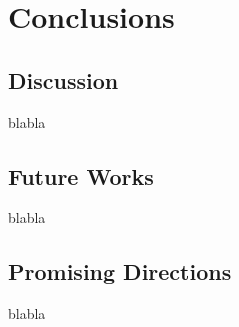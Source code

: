 %

\chapter{Conclusions}

\section{Discussion}

blabla

\section{Future Works}

blabla

\section{Promising Directions}

blabla

%


